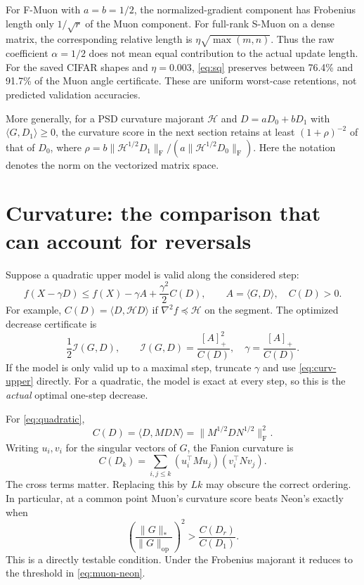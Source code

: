 \documentclass[11pt]{article}
\newcommand{\ip}[2]{\langle #1,#2\rangle}
\newcommand{\F}[1]{\lVert #1\rVert_{\mathrm F}}
\newcommand{\nuc}[1]{\lVert #1\rVert_*}
\newcommand{\op}[1]{\lVert #1\rVert_{\mathrm{op}}}
\newcommand{\pos}[1]{[#1]_+}
\begin{document}
For F-Muon with $a=b=1/2$, the normalized-gradient component has Frobenius
length only $1/\sqrt r$ of the Muon component. For full-rank S-Muon on a
dense matrix, the corresponding relative length is
$\eta\sqrt{\max(m,n)}$. Thus the raw coefficient $\alpha=1/2$ does not mean
equal contribution to the actual update length.
For the saved CIFAR shapes and $\eta=0.003$, \eqref{eq:sq} preserves between
76.4\% and 91.7\% of the Muon angle certificate. These are uniform
worst-case retentions, not predicted validation accuracies.

More generally, for a PSD curvature majorant $\mathcal H$ and
$D=aD_0+bD_1$ with $\ip{G}{D_1}\geq0$, the curvature score in the next
section retains at least $(1+\rho)^{-2}$ of that of $D_0$, where
$\rho=b\F{\mathcal H^{1/2}D_1}/(a\F{\mathcal H^{1/2}D_0})$.
Here the notation denotes the norm on the vectorized matrix space.

\section{Curvature: the comparison that can account for reversals}

Suppose a quadratic upper model is valid along the considered step:
\begin{equation}\label{eq:curv-upper}
 f(X-\gamma D)\leq f(X)-\gamma A+\frac{\gamma^2}{2}C(D),\qquad
 A=\ip{G}{D},\quad C(D)>0.
\end{equation}
For example, $C(D)=\ip{D}{\mathcal HD}$ if
$\nabla^2 f\preceq\mathcal H$ on the segment. The optimized decrease
certificate is
\begin{equation}\label{eq:curv-score}
 \frac12\mathcal I(G,D),\qquad
 \mathcal I(G,D)=\frac{\pos A^2}{C(D)},\quad
 \gamma=\frac{\pos A}{C(D)}.
\end{equation}
If the model is only valid up to a maximal step, truncate $\gamma$ and use
\eqref{eq:curv-upper} directly. For a quadratic, the model is exact at every
step, so this is the \emph{actual} optimal one-step decrease.

For \eqref{eq:quadratic},
\begin{equation}\label{eq:quad-curv}
 C(D)=\ip{D}{MDN}=\F{M^{1/2}DN^{1/2}}^2.
\end{equation}
Writing $u_i,v_i$ for the singular vectors of $G$, the Fanion curvature is
\[
 C(D_k)=\sum_{i,j\leq k}
  (u_i^\top M u_j)(v_i^\top N v_j).
\]
The cross terms matter. Replacing this by $Lk$ may obscure the correct
ordering. In particular, at a common point Muon's curvature score beats
Neon's exactly when
\begin{equation}\label{eq:curvature-condition}
 \left(\frac{\nuc G}{\op G}\right)^2>
 \frac{C(D_r)}{C(D_1)}.
\end{equation}
This is a directly testable condition. Under the Frobenius majorant it
reduces to the threshold in \eqref{eq:muon-neon}.
\end{document}

